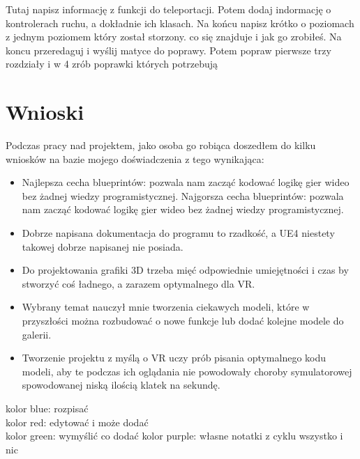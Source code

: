 \documentclass[a4paper,12pt,reqno]{article}
\begin{document}
{\color{purple}
Tutaj napisz informację z funkcji do teleportacji. Potem dodaj indormację o kontrolerach ruchu, a dokładnie ich klasach. Na końcu napisz krótko o poziomach z jednym poziomem który został storzony. co się znajduje i jak go zrobiłeś. Na koncu przeredaguj i wyślij matyce do poprawy. Potem popraw pierwsze trzy rozdziały i w 4 zrób poprawki których potrzebują
}
\newpage
\section{Wnioski}


Podczas pracy nad projektem, jako osoba go robiąca doszedłem do kilku wniosków na bazie mojego doświadczenia z tego wynikająca:

\begin{itemize}
\item Najlepsza cecha blueprintów: pozwala nam zacząć kodować logikę gier wideo bez żadnej wiedzy programistycznej. Najgorsza cecha blueprintów: pozwala nam zacząć kodować logikę gier wideo bez żadnej wiedzy programistycznej.
\item Dobrze napisana dokumentacja do programu to rzadkość, a UE4 niestety takowej dobrze napisanej nie posiada.
\item Do projektowania grafiki 3D trzeba mięć odpowiednie umiejętności i czas by stworzyć coś ładnego, a zarazem optymalnego dla VR.
\item Wybrany temat nauczył mnie tworzenia ciekawych modeli, które w przyszłości można rozbudować o nowe funkcje lub dodać kolejne modele do galerii.
\item Tworzenie projektu z myślą o VR uczy prób pisania optymalnego kodu modeli, aby te podczas ich oglądania nie powodowały choroby symulatorowej spowodowanej niską ilością klatek na sekundę.
\end{itemize}

\newpage




{\color{blue} kolor blue: rozpisać}\\
{\color{red} kolor red: edytować i może dodać}\\
{\color{green} kolor green: wymyślić co dodać}
{\color{purple} kolor purple: własne notatki z cyklu wszystko i nic}
\end{document}
